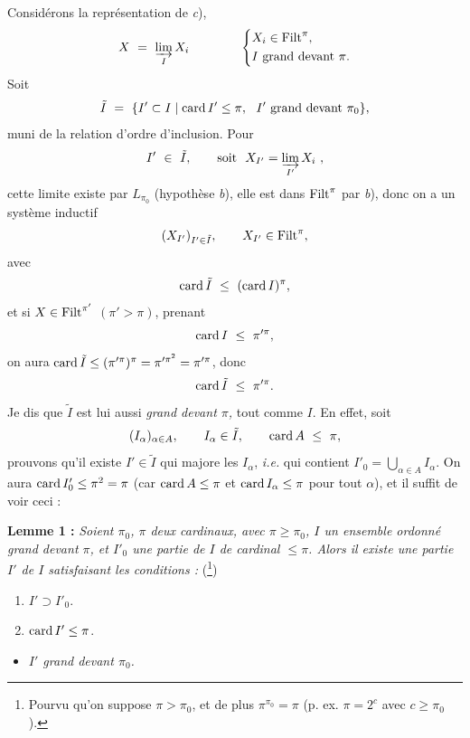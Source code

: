 Considérons la représentation de \textit{c}),
\[
X \ = \ \varinjlim_{I} X_i \qquad\qquad
\left\{
\begin{aligned}
& X_i \in \mathrm{Filt}^{\pi},\\
& I \text{ grand devant } \pi.
\end{aligned}
\right.
\]
Soit
\[
\tilde{I} \ = \ \{I' \subset I \mid \mathrm{card}\, I' \leq \pi,\ \ I' \text{ grand devant } \pi_0\},
\]
muni de la relation d'ordre d'inclusion. Pour
\[
I' \ \in\ \tilde{I}, \qquad \text{soit}\ \ X_{I'} = \varinjlim_{I'} X_i\ ,
\]
cette limite existe par $L_{\pi_0}$ (hypothèse \textit{b}), elle est dans $\mathrm{Filt}^{\pi}$ par \textit{b}), donc on a un système inductif
\[
(X_{I'})_{I' \in \tilde{I}}, \qquad X_{I'} \in \mathrm{Filt}^{\pi},
\]
avec
\[
\mathrm{card}\, \tilde{I} \ \leq\ (\mathrm{card}\, I)^{\pi},
\]
et si $X \in \mathrm{Filt}^{\pi'}$ $(\pi' > \pi)$, prenant
\[
\card I \ \leq\ \pi'^{\pi},
\]
on aura $\mathrm{card}\, \tilde{I} \leq (\pi'^{\pi})^{\pi} = \pi'^{\pi^2} = \pi'^{\pi}$, donc
\[
\mathrm{card}\, \tilde{I} \ \leq\ \pi'^{\pi}.
\]
Je dis que $\tilde{I}$ est lui aussi \textit{grand devant $\pi$,} tout comme $I$. En effet,
soit
\[
(I_\alpha)_{\alpha \in A}, \qquad I_\alpha \in \tilde{I}, \qquad \mathrm{card}\, A \ \leq\ \pi,
\]
prouvons qu'il existe $I' \in \tilde{I}$ qui majore les $I_\alpha$, \textit{i.e.} qui contient $I'_0 = \bigcup_{\alpha \in A} I_\alpha$. On aura $\mathrm{card}\, I'_0 \leq \pi^2 = \pi$ (car $\mathrm{card}\, A \leq \pi$ et $\mathrm{card}\, I_\alpha \leq \pi$ pour tout $\alpha$), et il suffit de voir ceci :



\textbf{Lemme 1 :} \textit{Soient $\pi_0$, $\pi$ deux cardinaux, avec $\pi \geq \pi_0$, $I$ un ensemble ordonné grand devant $\pi$, et $I'_0$ une partie de $I$ de cardinal $\leq \pi$. Alors il existe une partie $I'$ de $I$ satisfaisant les conditions :} (\footnote[40]{Pourvu qu'on suppose $\pi > \pi_0$, et de plus $\pi^{\pi_0} = \pi$ (p. ex. $\pi = 2^c$ avec $c \geq \pi_0$).})

\begin{enumerate}
\item[a)] $I' \supset I'_0$.
\item[b)] $\mathrm{card}\, I' \leq \pi$.
\end{enumerate}


\begin{itemize}
\item[c)] \textit{$I'$ grand devant $\pi_0$.}
\end{itemize}


